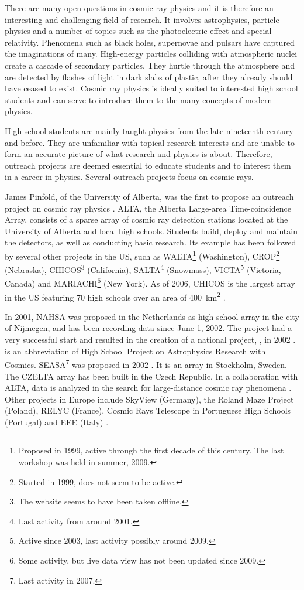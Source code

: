 There are many open questions in cosmic ray physics and it is therefore an
interesting and challenging field of research.  It involves astrophysics,
particle physics and a number of topics such as the photoelectric effect and
special relativity. Phenomena such as black holes, supernovae and pulsars have
captured the imaginations of many. High-energy particles colliding with
atmospheric nuclei create a cascade of secondary particles.  They hurtle through
the atmosphere and are detected by flashes of light in dark slabs of plastic,
after they already should have ceased to exist.  Cosmic ray physics is ideally
suited to interested high school students and can serve to introduce them to the many
concepts of modern physics.

High school students are mainly taught physics from the late nineteenth century
and before.  They are unfamiliar with topical research interests and are unable
to form an accurate picture of what research and physics is about.  Therefore,
outreach projects are deemed essential to educate students and to interest them
in a career in physics.  Several outreach projects focus on cosmic rays.

James Pinfold, of the University of Alberta, was the first to propose an
outreach project on cosmic ray physics \cite{Pinfold:www}.  ALTA, the Alberta
Large-area Time-coincidence Array, consists of a sparse array of cosmic ray
detection stations located at the University of Alberta and local high schools.
Students build, deploy and maintain the detectors, as well as conducting basic
research.  Its example has been followed by several other projects in the US, such as
WALTA\footnote{Proposed in 1999, active through the first decade of this
century.  The last workshop was held in summer, 2009.} (Washington),
CROP\footnote{Started in 1999, does not seem to be active.} (Nebraska),
CHICOS\footnote{The website seems to have been taken offline.} (California),
SALTA\footnote{Last activity from around 2001.} (Snowmass),
VICTA\footnote{Active since 2003, last activity possibly around 2009.}
(Victoria, Canada) and MARIACHI\footnote{Some activity, but live data view has not
been updated since 2009.} (New York).
As of 2006, CHICOS is the largest array in the US featuring 70 high schools over
an area of \SI{400}{\kilo\meter\squared} \cite{Pinfold:2006}.

In 2001, NAHSA was proposed \cite{NAHSA:2001} in the Netherlands as high school
array in the city of Nijmegen, and has been recording data since June 1, 2002. The
project had a very successful start and resulted in the creation of a national
project, \hisparc, in 2002 \cite{HiSPARC:2002}. \hisparc is an abbreviation of
High School Project on Astrophysics Research with Cosmics. SEASA\footnote{Last activity in
2007.} was proposed in 2002 \cite{SEASA:2002}.
It is an array in Stockholm, Sweden. The CZELTA array has been built in the
Czech Republic.  In a collaboration with ALTA, data is analyzed in the search for
large-distance cosmic ray phenomena \cite{Smolek:2009}. Other projects in Europe
include SkyView (Germany), the Roland Maze Project (Poland), RELYC (France),
Cosmic Rays Telescope in Portuguese High Schools (Portugal) and EEE (Italy)
\cite{Pinfold:2006}.

